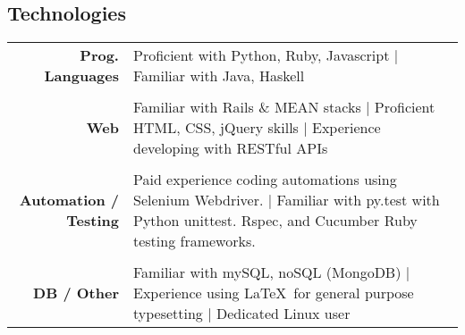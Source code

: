 \documentclass[11pt,line,centered]{res}
\begin{document}
\begin{resume}
\section{\sectionfont\normalsize Technologies}
    \vspace{1em}
    \begin{tabulary}{\textwidth}{RJ}
            {\bfseries\footnotesize Prog. Languages} & Proficient with Python, Ruby, Javascript | Familiar with Java, Haskell\\
            \\
            {\bfseries\footnotesize Web} & Familiar with Rails \& MEAN stacks | Proficient HTML, CSS, jQuery skills | Experience developing with RESTful APIs\\
            \\
            {\bfseries\footnotesize Automation / Testing} & Paid experience coding automations using Selenium Webdriver. | Familiar with py.test with Python unittest. Rspec, and Cucumber Ruby testing frameworks.\\
            \\
            {\bfseries\footnotesize DB / Other} & Familiar with mySQL, noSQL (MongoDB) | Experience using \LaTeX\ for general purpose typesetting | Dedicated Linux user\\
        \end{tabulary}
\end{resume}
\end{document}
